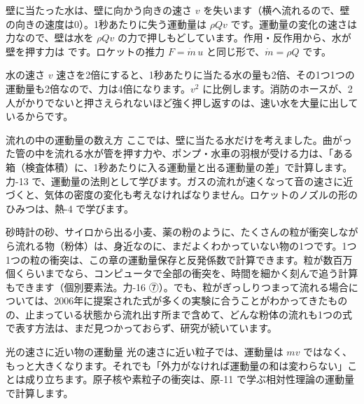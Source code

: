 \par\vspace{4pt}
壁に当たった水は、壁に向かう向きの速さ $v$ を失います（横へ流れるので、壁の向きの速度は0）。1秒あたりに失う運動量は $\rho Qv$ です。運動量の変化の速さは力なので、壁は水を $\rho Qv$ の力で押しもどしています。作用・反作用から、水が壁を押す力は
です。ロケットの推力 $F=\dot m\,u$ と同じ形で、$\dot m=\rho Q$ です。

\begin{phbaisuru}{水の速さ $v$}
速さを2倍にすると、1秒あたりに当たる水の量も2倍、その1つ1つの運動量も2倍なので、力は4倍になります。$v^2$ に比例します。消防のホースが、2人がかりでないと押さえられないほど強く押し返すのは、速い水を大量に出しているからです。
\end{phbaisuru}

\begin{phsaki}{流れの中の運動量の数え方}
ここでは、壁に当たる水だけを考えました。曲がった管の中を流れる水が管を押す力や、ポンプ・水車の羽根が受ける力は、「ある箱（検査体積）に、1秒あたりに入る運動量と出る運動量の差」で計算します。力-13 で、運動量の法則として学びます。ガスの流れが速くなって音の速さに近づくと、気体の密度の変化も考えなければなりません。ロケットのノズルの形のひみつは、熱-4 で学びます。
\end{phsaki}

\begin{phmada}[たくさんの粒がぶつかり合う流れ]
砂時計の砂、サイロから出る小麦、薬の粉のように、たくさんの粒が衝突しながら流れる物（粉体）は、身近なのに、まだよくわかっていない物の1つです。1つ1つの粒の衝突は、この章の運動量保存と反発係数で計算できます。粒が数百万個くらいまでなら、コンピュータで全部の衝突を、時間を細かく刻んで追う計算もできます（個別要素法。力-16 ⑦）。でも、粒がぎっしりつまって流れる場合については、2006年に提案された式が多くの実験に合うことがわかってきたものの、止まっている状態から流れ出す所まで含めて、どんな粉体の流れも1つの式で表す方法は、まだ見つかっておらず、研究が続いています。
\end{phmada}

\begin{phsaki}{光の速さに近い物の運動量}
光の速さに近い粒子では、運動量は $mv$ ではなく、もっと大きくなります。それでも「外力がなければ運動量の和は変わらない」ことは成り立ちます。原子核や素粒子の衝突は、原-11 で学ぶ相対性理論の運動量で計算します。
\end{phsaki}

